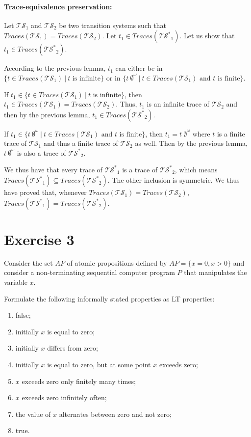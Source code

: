 \documentclass[11pt,a4paper]{article}
\def\ts{\mathcal{TS}}
\def\tss{\mathcal{TS^*}}
\def\traces{\mathit{Traces}}
\begin{document}
\begin{Answer}[number=2]
\paragraph{Trace-equivalence preservation:} Let $\ts_1$ and $\ts_2$ be two transition systems such that $\traces(\ts_1)=\traces(\ts_2)$. Let $t_1\in\traces(\tss_1)$. Let us show that $t_1\in\traces(\tss_2)$.

According to the previous lemma, $t_1$ can either be in $\{t\in\traces(\ts_1)~|~t\text{ is infinite}\}$ or in $\{t\ \emptyset^\omega~|~t\in\traces(\ts_1)\text{ and $t$ is finite}\}$.

If $t_1\in\{t\in\traces(\ts_1)~|~t\text{ is infinite}\}$, then $t_1\in\traces(\ts_1)=\traces(\ts_2)$. Thus, $t_1$ is an infinite trace of $\ts_2$ and then by the previous lemma, $t_1\in\traces(\tss_2)$.

If $t_1\in\{t\ \emptyset^\omega~|~t\in\traces(\ts_1)\text{ and $t$ is finite}\}$, then $t_1=t\ \emptyset^\omega$ where $t$ is a finite trace of $\ts_1$ and thus a finite trace of $\ts_2$ as well. Then by the previous lemma, $t\ \emptyset^\omega$ is also a trace of $\tss_2$.

We thus have that every trace of $\tss_1$ is a trace of $\tss_2$, which means $\traces(\tss_1)\subseteq\traces(\tss_2)$. The other inclusion is symmetric. We thus have proved that, whenever $\traces(\ts_1)=\traces(\ts_2)$, $\traces(\tss_1)=\traces(\tss_2)$.\\
\end{Answer}

\section*{Exercise 3}

\def\badp{\mathit{BadPref}}
\def\pref{\mathit{Pref}}
\def\twoap{2^{AP}}
\def\star{^*}
\def\cl{\mathit{Cl}}


Consider the set $AP$ of atomic propositions defined by $AP = \{ x = 0,x > 0 \}$ and consider a non-terminating sequential computer program $P$ that manipulates the variable $x$.

Formulate the following informally stated properties as LT properties:
\begin{enumerate}
\item false;
\item initially $x$ is equal to zero;
\item initially $x$ differs from zero;
\item initially $x$ is equal to zero, but at some point $x$ exceeds zero;
\item $x$ exceeds zero only finitely many times;
\item $x$ exceeds zero infinitely often;
\item the value of $x$ alternates between zero and not zero;
\item true.
\end{enumerate}
\end{document}
